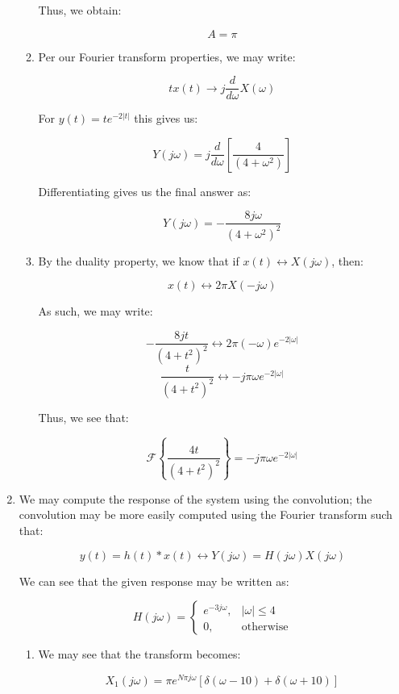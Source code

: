 \begin{enumerate}
\begin{enumerate}
        Thus, we obtain:

        $$\boxed{A=\pi}$$

      \item Per our Fourier transform properties, we may write:

        $$tx(t)\to j\frac{d}{d\omega}X(\omega)$$

        For $y(t)=te^{-2|t|}$ this gives us:

        $$Y(j\omega)=j\frac{d}{d\omega}\left[ \frac{4}{(4+\omega^2)} \right]$$

        Differentiating gives us the final answer as:

        $$\boxed{Y(j\omega)=-\frac{8j\omega}{(4+\omega^2)^2}}$$

      \item By the duality property, we know that if $x(t)\leftrightarrow X(j\omega)$, then:

        $$x(t)\leftrightarrow 2\pi X(-j\omega)$$

        As such, we may write:

        $$-\frac{8jt}{(4+t^2)^2}\leftrightarrow 2\pi(-\omega)e^{-2|\omega|}$$
        $$\frac{t}{(4+t^2)^2}\leftrightarrow -j\pi\omega e^{-2|\omega|}$$

        Thus, we see that:

        $$\boxed{\mathcal{F}\left\{ \frac{4t}{(4+t^2)^2} \right\}=-j\pi\omega e^{-2|\omega|}}$$

    \end{enumerate}

  \item We may compute the response of the system using the convolution; the convolution may be more easily computed using the Fourier transform such that:

    $$y(t)=h(t)*x(t)\leftrightarrow Y(j\omega)=H(j\omega)X(j\omega)$$

    We can see that the given response may be written as:

    $$H(j\omega)=\left\{\begin{array}{ll} e^{-3j\omega},&|\omega|\leq4\\0,&\text{otherwise}\end{array}$$

    \begin{enumerate}

      \item We may see that the transform becomes:

        $$X_1(j\omega)=\pi e^{N\pi j\omega}\left[ \delta(\omega-10)+\delta(\omega+10) \right]$$


\end{enumerate}
\end{enumerate}
